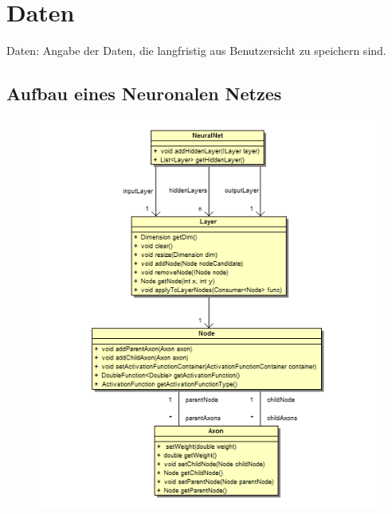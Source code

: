 \chapter{Daten}
Daten: Angabe der Daten, die langfristig aus Benutzersicht zu speichern sind.

\section{Aufbau eines Neuronalen Netzes}

\begin{figure}[h]
\begin{center}
\includegraphics{Abbildungen/UML/uml_ronny/neuralnetclass.png}
\end{center}
\end{figure}
